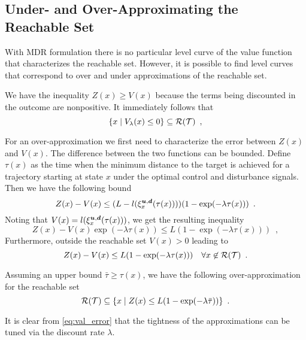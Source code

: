 \subsection{Under- and Over-Approximating the Reachable Set}
With MDR formulation there is no particular level curve of the value function that characterizes the reachable set. However, it is possible to find level curves that correspond to over and under approximations of the reachable set. 

We have the inequality $Z(x) \geq V(x)$ because the terms being discounted in the outcome are nonpositive. It immediately follows that
%
\begin{equation} \label{eq:reach_set}
\{x \mid V_{\lambda}(x) \le 0\} \subseteq \mathcal{R}(\mathcal{T}) \enspace,
\end{equation}  

For an over-approximation we first need to characterize the error between $Z(x)$ and $V(x)$. The difference between the two functions can be bounded. Define $\tau(x)$ as the time when the minimum distance to the target is achieved for a trajectory starting at state $x$ under the optimal control and disturbance signals. Then we have the following bound
%
\begin{equation}
Z(x) - V(x)  \leq (L - l(\xi_{x}^{\bm{u},\bm{d}}(\tau(x))))( 1 -  \exp(-\lambda \tau(x)))
\enspace.
\end{equation}%
\noindent Noting that $V(x)=l(\xi_{x}^{\bm{u},\bm{d}}(\tau(x)))$, we get the resulting inequality
%
\begin{equation} \label{eq:val_error}
Z(x) -  V(x) \exp(-\lambda \tau(x)) \leq L( 1 -  \exp(-\lambda \tau(x))) \enspace,
\end{equation}%
\noindent Furthermore, outside the reachable set $V(x)>0$ leading to
%
\begin{equation}
Z(x) -  V(x)  \leq L( 1 -  \exp(-\lambda \tau(x))) \quad \forall x \not\in \mathcal{R}(\mathcal{T}) \enspace.
\end{equation}

Assuming an upper bound  ${\bar{\tau} \geq \tau(x)}$, we have the following over-approximation for the reachable set
%
\begin{equation} \label{eq:reach_set}
\mathcal{R}(\mathcal{T}) \subseteq  \{x \mid Z(x) \le L( 1 -  \exp(-\lambda \bar{\tau})) \} \enspace.
\end{equation} 

It is clear from \eqref{eq:val_error} that the tightness of the approximations can be tuned via the discount rate $\lambda$.
